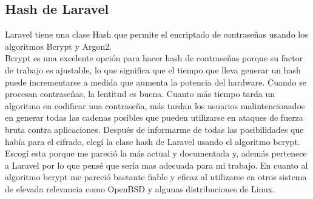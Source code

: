 \subsection{Hash de Laravel}
Laravel tiene una clase Hash que permite el encriptado de contraseñas usando los algoritmos Bcrypt y Argon2.\\
Bcrypt es una excelente opción para hacer hash de contraseñas porque su factor de trabajo es ajustable, lo que significa que el tiempo que lleva generar un hash puede incrementarse a medida que aumenta la potencia del hardware. Cuando se procesan contraseñas, la lentitud es buena. Cuanto más tiempo tarda un algoritmo en codificar una contraseña, más tardan los usuarios malintencionados en generar todas las cadenas posibles que pueden utilizarse en ataques de fuerza bruta contra aplicaciones.\cite{HashLaravel}
Después de informarme de todas las posibilidades que había para el cifrado, elegí la clase hash de Laravel usando el algoritmo bcrypt.\\
Escogí esta porque me pareció la más actual y documentada y, además pertenece a Laravel por lo que pensé que sería mas adecuada para mi trabajo. En cuanto al algoritmo bcrypt me pareció bastante fiable y eficaz al utilizarse en otros sistema de elevada relevancia como OpenBSD y algunas distribuciones de Linux.
